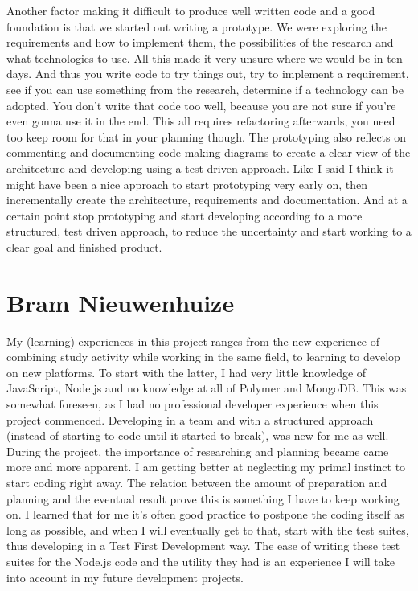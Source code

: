 Another factor making it difficult to produce well written code
and a good foundation
is that we started out writing a prototype.
We were exploring the requirements and how to implement them,
the possibilities of the research
and what technologies to use.
All this made it very unsure where we would be in ten days.
And thus you write code to try things out,
try to implement a requirement,
see if you can use something from the research,
determine if a technology can be adopted.
You don't write that code too well,
because you are not sure if you're even gonna use it in the end.
This all requires refactoring afterwards,
you need too keep room for that in your planning though.
The prototyping also reflects on commenting and documenting code
making diagrams to create a clear view of the architecture
and developing using a test driven approach.
Like I said I think it might have been a nice approach
to start prototyping very early on,
then incrementally create the architecture, requirements and documentation.
And at a certain point stop prototyping
and start developing according to a more structured, test driven approach,
to reduce the uncertainty
and start working to a clear goal and finished product.

\section{Bram Nieuwenhuize}
My (learning) experiences in this project ranges from the new experience of 
combining study activity while working in the same field, to learning to develop 
on new platforms.
To start with the latter, I had very little knowledge of 
JavaScript, Node.js and no knowledge at all of Polymer and 
MongoDB. This was somewhat foreseen, as I had no 
professional developer experience when this project 
commenced. Developing in a team and with a
structured approach (instead of starting to code until it started to break),
was new for me as well. During the project, the importance of 
researching and planning became came more and more apparent. I am getting better
at neglecting my primal instinct to start coding right away. The relation 
between the amount of preparation and planning and the eventual result prove 
this is something I have to keep working on. I learned that for me it's often
good practice to postpone the coding itself as long as possible, and when I will
eventually get to that, start with the test suites, thus developing in a Test 
First Development way. The ease of writing these test suites for the Node.js
code and the utility they had is an experience I will take into account in my
future development projects.

